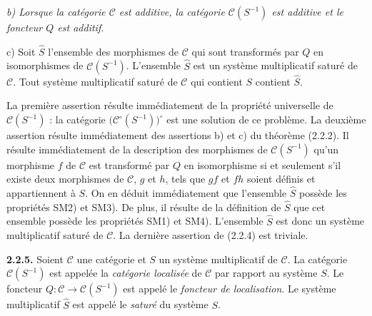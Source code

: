 \clearpage
{}%
\begingroup
\small
\setlength{\emergencystretch}{2em}%
\setlength{\parskip}{0pt}%
\setlength{\abovedisplayskip}{1pt plus 1pt minus 1pt}%
\setlength{\belowdisplayskip}{1pt plus 1pt minus 1pt}%

\begingroup\itshape
{}
\noindent b) Lorsque la catégorie $\mathcal C$ est additive, la catégorie
$\mathcal C(S^{-1})$ est additive et le foncteur $Q$ est additif.

\par\noindent c) Soit $\widehat S$ l'ensemble des morphismes de $\mathcal C$
qui sont transformés par $Q$ en isomorphismes de $\mathcal C(S^{-1})$.
%
L'ensemble $\widehat S$ est un système multiplicatif saturé de $\mathcal C$.
Tout système multiplicatif saturé de $\mathcal C$ qui contient $S$ contient
$\widehat S$.
\endgroup

\par\noindent La première assertion résulte immédiatement de la propriété
universelle de $\mathcal C(S^{-1})$ : la catégorie
$\bigl(\mathcal C^\circ(S^{-1})\bigr)^\circ$ est une solution de ce problème.
La deuxième assertion résulte immédiatement des assertions b) et c) du
théorème (2.2.2).
%
Il résulte immédiatement de la description des morphismes de
$\mathcal C(S^{-1})$ qu'un morphisme $f$ de $\mathcal C$ est transformé par
$Q$ en isomorphisme si et seulement s'il existe deux morphismes de
$\mathcal C$, $g$ et $h$, tels que $gf$ et $fh$ soient définis et
appartiennent à $S$.
%
On en déduit immédiatement que l'ensemble $\widehat S$ possède les
propriétés SM2) et SM3).
%
De plus, il résulte de la définition de $\widehat S$ que cet ensemble possède
les propriétés SM1) et SM4).
%
L'ensemble $\widehat S$ est donc un système multiplicatif saturé de
$\mathcal C$. La dernière assertion de (2.2.4) est triviale.

\smallskip
\noindent\textbf{2.2.5.} Soient $\mathcal C$ une catégorie et $S$ un système
multiplicatif de $\mathcal C$.
%
La catégorie $\mathcal C(S^{-1})$ est appelée la \emph{catégorie localisée}
de $\mathcal C$ par rapport au système $S$.
%
Le foncteur $Q\colon\mathcal C\longrightarrow\mathcal C(S^{-1})$ est appelé
le \emph{foncteur de localisation}.
%
Le système multiplicatif $\widehat S$ est appelé le \emph{saturé} du système
$S$.

